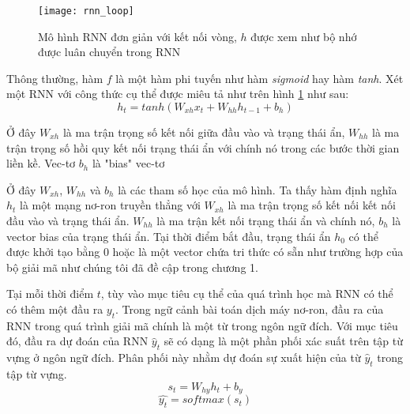 
\begin{figure}
	\centering
	\texttt{[image: rnn\_loop]}
	\caption[Mô hình RNN đơn giản]{Mô hình RNN đơn giản với kết nối vòng, \textbf{$h$} được xem như bộ nhớ được luân chuyển trong RNN}
	\label{fig_rnn_loop}
\end{figure}


Thông thường, hàm $f$ là một hàm phi tuyến như hàm \textit{sigmoid} hay hàm \textit{tanh}. Xét một RNN với công thức cụ thể được miêu tả như trên hình \ref{fig_rnn_loop} như sau:
\begin{equation} \label{rnnWithTanh}
	h_t = tanh \left(W_{xh} x_t + W_{hh}h_{t-1} + b_h \right)
\end{equation}

Ở đây $W_{xh}$ là ma trận trọng số kết nối giữa đầu vào và trạng thái ẩn, $W_{hh}$ là ma trận trọng số hồi quy kết nối trạng thái ẩn với chính nó trong các bước thời gian liền kề. Vec-tơ $b_h$ là "bias" vec-tơ 

Ở đây $W_{xh}$, $W_{hh}$ và $b_h$ là các tham số học của mô hình. Ta thấy hàm định nghĩa $h_t$ là một mạng nơ-ron truyền thẳng với $W_{xh}$ là ma trận trọng số kết nối kết nối đầu vào và trạng thái ẩn. $W_{hh}$ là ma trận kết nối trạng thái ẩn và chính nó, $b_h$ là vector bias của trạng thái ẩn. Tại thời điểm bắt đầu, trạng thái ẩn $h_0$ có thể được khởi tạo bằng 0 hoặc là một vector chứa tri thức có sẵn như trường hợp của bộ giải mã như chúng tôi đã đề cập trong chương 1.

Tại mỗi thời điểm $t$, tùy vào mục tiêu cụ thể của quá trình học mà RNN có thể có thêm một đầu ra $y_t$. Trong ngữ cảnh bài toán dịch máy nơ-ron, đầu ra của RNN trong quá trình giải mã chính là một từ trong ngôn ngữ đích. Với mục tiêu đó, đầu ra dự đoán của RNN $\hat{y}_t$ sẽ có dạng là một phần phối xác suất trên tập từ vựng ở ngôn ngữ đích. Phân phối này nhằm dự đoán sự xuất hiện của từ $\hat{y}_t$ trong tập từ vựng.
\begin{equation} \label{rnnOuputSoftmax}
	s_t = W_{hy}h_t + b_y
\end{equation} 
\begin{equation} \label{rnnOuputSoftmaxDistribution}
	\hat{y_t} = softmax(s_t)
\end{equation}

